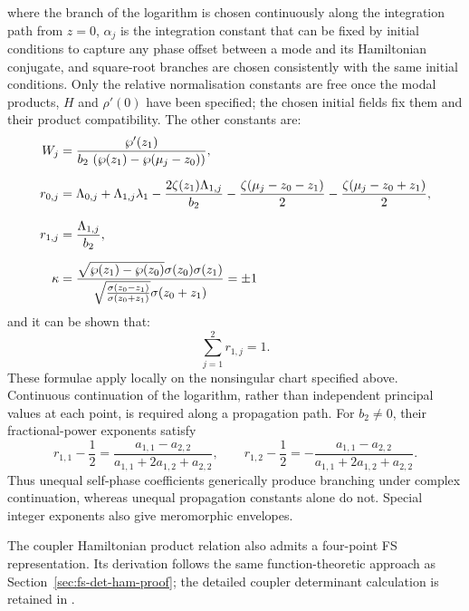 \documentclass[11pt,a4paper]{article}
\numberwithin{equation}{section}
\begin{document}
where the branch of the logarithm is chosen continuously along the integration path from $z=0$, $\alpha_j$ is the integration constant that can be fixed by initial conditions to capture any phase offset between a mode and its Hamiltonian conjugate, and square-root branches are chosen consistently with the same initial conditions.
Only the relative normalisation constants are free once the modal products, $H$ and $\rho'(0)$ have been specified; the chosen initial fields fix them and their product compatibility.
The other constants are:
\begin{align}
W_j &= \frac{\wp'{\left(z_{1} \right)}}{b_2\,\left(\wp{\left(z_{1} \right)} - \wp{\left({\mu}_{j} - z_{0}\right)}\right)}, \notag \\[6pt]
r_{0,j} &= {\Lambda}_{0,j} + {\Lambda}_{1,j} {\lambda}_{1} - \frac{2 \zeta{\left(z_{1} \right)} {\Lambda}_{1,j}}{b_2} - \frac{\zeta{\left({\mu}_{j} - z_{0} - z_{1}\right)}}{2} - \frac{\zeta{\left({\mu}_{j} - z_{0} + z_{1}\right)}}{2}, \notag \\[6pt]
r_{1,j} &= \frac{{\Lambda}_{1,j}}{b_2}, \notag \\[6pt]
\kappa &= \frac{\sqrt{\wp{\left(z_{1}\right)} - \wp{\left(z_{0}\right)}} \sigma{\left(z_{0}\right)} \sigma{\left(z_{1}\right)}}{\sqrt{\frac{\sigma{\left(z_{0} - z_{1}\right)}}{\sigma{\left(z_{0} + z_{1}\right)}}} \sigma{\left(z_{0} + z_{1}\right)}} = \pm 1
\end{align}
and it can be shown that:
\begin{equation}
  \sum_{j=1}^{2}r_{1,j} = 1. \label{cc:eq:r1j-sum}
\end{equation}
These formulae apply locally on the nonsingular chart specified above.
Continuous continuation of the logarithm, rather than independent principal values at each point, is required along a propagation path.
For $b_2\ne0$, their fractional-power exponents satisfy
\begin{equation}
r_{1,1}-\frac12=\frac{a_{1,1}-a_{2,2}}{a_{1,1}+2a_{1,2}+a_{2,2}},\qquad
r_{1,2}-\frac12=-\frac{a_{1,1}-a_{2,2}}{a_{1,1}+2a_{1,2}+a_{2,2}}.
\label{cc:eq:branch-asymmetry}
\end{equation}
Thus unequal self-phase coefficients generically produce branching under complex continuation, whereas unequal propagation constants alone do not.
Special integer exponents also give meromorphic envelopes.

The coupler Hamiltonian product relation also admits a four-point FS representation.
Its derivation follows the same function-theoretic approach as Section~\ref{sec:fs-det-ham-proof}; the detailed coupler determinant calculation is retained in \cite{heskethCompleteWeierstrassElliptic2026}.
\end{document}
